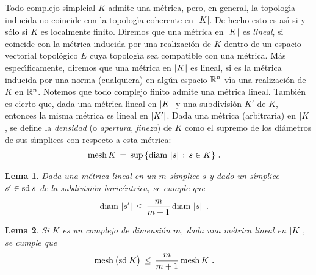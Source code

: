 \theoremstyle{plain}
\newtheorem{lemaAcotarLaMetricaEnSimplices}{Lema}[section]
\newtheorem{lemaAcotarLaMetricaEnComplejos}[lemaAcotarLaMetricaEnSimplices]%
	{Lema}
\newtheorem{teoRefinarPorTriangulaciones}[lemaAcotarLaMetricaEnSimplices]%
	{Teorema}

\theoremstyle{remark}


Todo complejo simplcial $K$ admite una m\'{e}trica, pero, en general,
la topolog\'{\i}a inducida no coincide con la topolog\'{\i}a coherente
en $\left|K\right|$. De hecho esto es as\'{\i} si y s\'{o}lo si $K$ es localmente
finito. Diremos que una m\'{e}trica en $\left|K\right|$ es \emph{lineal}, si
coincide con la m\'{e}trica inducida por una realizaci\'{o}n de $K$ dentro de
un espacio vectorial topol\'{o}gico $E$ cuya topolog\'{\i}a sea compatible con
una m\'{e}trica. M\'{a}s espec\'{\i}ficamente, diremos que una m\'{e}trica en
$\left|K\right|$ es lineal, si es la m\'{e}trica inducida por una norma
(cualquiera) en alg\'{u}n espacio $\mathbb{R}^{n}$ v\'{\i}a una realizaci\'{o}n
de $K$ en $\mathbb{R}^{n}$. Notemos que todo complejo finito admite una
m\'{e}trica lineal. Tambi\'{e}n es cierto que, dada una m\'{e}trica lineal
en $\left|K\right|$ y una subdivisi\'{o}n $K'$ de $K$, entonces la misma m\'{e}trica
es lineal en $\left|K'\right|$. Dada una m\'{e}trica (arbitraria) en $\left|K\right|$,
se define la \emph{densidad} (o \emph{apertura}, \emph{fineza}) de $K$ como
el supremo de los di\'{a}metros de sus s\'{\i}mplices con respecto a
esta m\'{e}trica:
\begin{align*}
	\mathrm{mesh}\,K & \,=\,\sup\,\{\mathrm{diam}\,\left|s\right|\,:\,s\in K\}
	\text{ .}
\end{align*}
%

\begin{lemaAcotarLaMetricaEnSimplices}\label{thm:acotarlametricaensimplices}
	Dada una m\'{e}trica lineal en un $m$ s\'{\i}mplice $s$ y dado un
	s\'{\i}mplice $s'\in\mathrm{sd}^{}\,\overline{s}$ de la subdivisi\'{o}n
	baric\'{e}ntrica, se cumple que
	\begin{align*}
		\mathrm{diam}\,\left|s'\right| & \,\leq\,\frac{m}{m+1}\,
			\mathrm{diam}\,\left|s\right|
		\text{ .}
	\end{align*}
\end{lemaAcotarLaMetricaEnSimplices}

\begin{lemaAcotarLaMetricaEnComplejos}\label{thm:acotarlametricaencomplejos}
	Si $K$ es un complejo de dimensi\'{o}n $m$, dada una m\'{e}trica
	lineal en $\left|K\right|$, se cumple que
	\begin{align*}
		\mathrm{mesh}\,\big(\mathrm{sd}^{}\,K\big) & \,\leq\,\frac{m}{m+1}\,
			\mathrm{mesh}\,K
		\text{ .}
	\end{align*}
\end{lemaAcotarLaMetricaEnComplejos}

